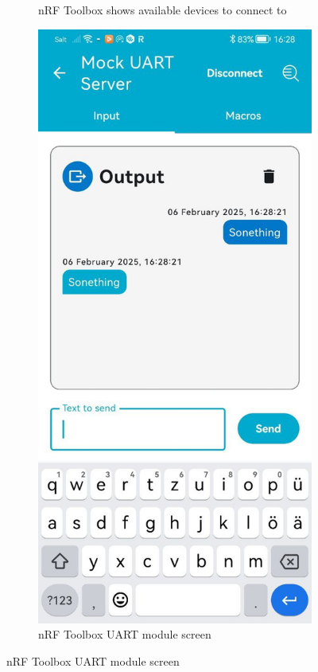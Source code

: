 \begin{figure}[ht!]
\begin{subfigure}{.4\linewidth}
	\caption{nRF Toolbox shows available devices to connect to}
	\label{f:Toolbox_connect}
\end{subfigure}
\hspace*{.1\linewidth}
\begin{subfigure}{.4\linewidth}
	\includegraphics[trim={0 0 0 1.5cm},clip, width=\linewidth]{graphics/nRF_toolbox_messanger.jpg}
	\caption{nRF Toolbox UART module screen}
	\label{f:Toolbox_output}
\end{subfigure}
\end{figure}

